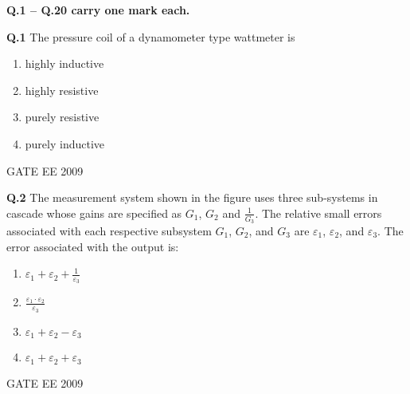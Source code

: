 \documentclass[12pt]{article}
\begin{document}
\noindent
\textbf{Q.1 – Q.20 carry one mark each.}

\vspace{10pt}

\noindent
\textbf{Q.1} The pressure coil of a dynamometer type wattmeter is 
\begin{enumerate}
    \item highly inductive \hspace{10pt}
\item  highly resistive \hspace{10pt}
\item  purely resistive \hspace{10pt}
\item purely inductive

\end{enumerate}
\hspace{10pt}
GATE EE 2009 

\vspace{10pt}

\noindent
\textbf{Q.2} The measurement system shown in the figure uses three sub-systems in cascade whose gains are specified as $G_1$, $G_2$ and $\frac{1}{G_3}$. The relative small errors associated with each respective subsystem $G_1$, $G_2$, and $G_3$ are $\varepsilon_1$, $\varepsilon_2$, and $\varepsilon_3$. The error associated with the output is: \\
\begin{center}
\end{center}

\noindent
\begin{enumerate}
    \item  $\varepsilon_1 + \varepsilon_2 + \frac{1}{\varepsilon_3}$ \hspace{10pt}
 \item $\frac{\varepsilon_1 \cdot \varepsilon_2}{\varepsilon_3}$ \hspace{10pt}
 \item $\varepsilon_1 + \varepsilon_2 - \varepsilon_3$ \hspace{10pt}
 \item $\varepsilon_1 + \varepsilon_2 + \varepsilon_3$
\end{enumerate}
\hspace{10pt}
GATE EE 2009
\vspace{10pt}
\end{document}
